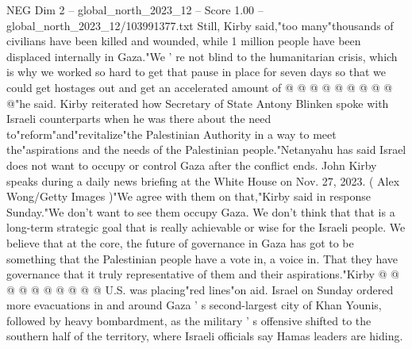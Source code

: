 \begin{textsample}{NEG Dim 2 – global\_north\_2023\_12 – Score 1.00 – global\_north\_2023\_12/103991377.txt}
Still, Kirby said,"too many"thousands of civilians have been killed and wounded, while 1 million people have been displaced internally in Gaza."We ' re not blind to the humanitarian crisis, which is why we worked so hard to get that pause in place for seven days so that we could get hostages out and get an accelerated amount of @ @ @ @ @ @ @ @ @ @"he said.
Kirby reiterated how Secretary of State Antony Blinken spoke with Israeli counterparts when he was there about the need to"reform"and"revitalize"the Palestinian Authority in a way to meet the"aspirations and the needs of the Palestinian people."Netanyahu has said Israel does not want to occupy or control Gaza after the conflict ends.
John Kirby speaks during a daily news briefing at the White House on Nov. 27, 2023. ( Alex Wong/Getty Images )"We agree with them on that,"Kirby said in response Sunday."We don't want to see them occupy Gaza.
We don't think that that is a long-term strategic goal that is really achievable or wise for the Israeli people.
We believe that at the core, the future of governance in Gaza has got to be something that the Palestinian people have a vote in, a voice in.
That they have governance that it truly representative of them and their aspirations."Kirby @ @ @ @ @ @ @ @ @ @ U.S. was placing"red lines"on aid.
Israel on Sunday ordered more evacuations in and around Gaza ' s second-largest city of Khan Younis, followed by heavy bombardment, as the military ' s offensive shifted to the southern half of the territory, where Israeli officials say Hamas leaders are hiding.

\end{textsample}
